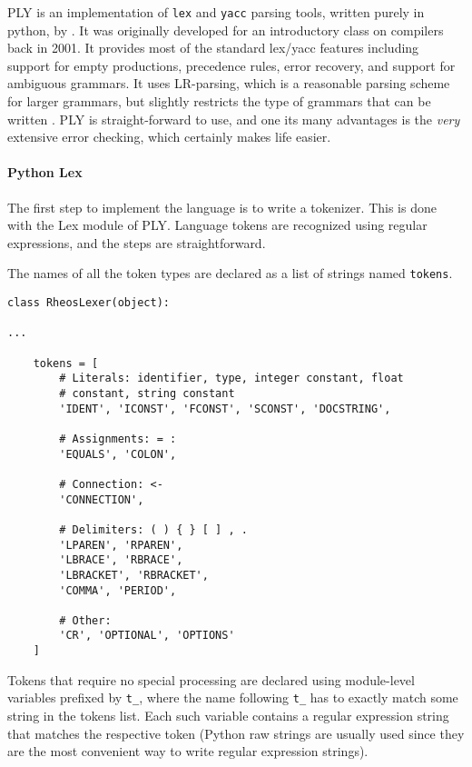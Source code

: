 PLY is an implementation of \texttt{lex} and \texttt{yacc} parsing
tools, written purely in python, by \citet{ply:online}. It was
originally developed for an introductory class on compilers back in
2001. It provides most of the standard lex/yacc features including
support for empty productions, precedence rules, error recovery, and
support for ambiguous grammars. It uses LR-parsing, which is a
reasonable parsing scheme for larger grammars, but slightly restricts
the type of grammars that can be written \citep{aho:2007}. PLY is
straight-forward to use, and one its many advantages is
the \emph{very} extensive error checking, which certainly makes life
easier.

\paragraph{Python Lex}
The first step to implement the language is to write a tokenizer. This
is done with the Lex module of PLY. Language tokens are recognized
using regular expressions, and the steps are straightforward.

The names of all the token types are declared as a list of strings
named \texttt{tokens}.

\begin{lstlisting}
class RheosLexer(object):

...

    tokens = [
        # Literals: identifier, type, integer constant, float
        # constant, string constant
        'IDENT', 'ICONST', 'FCONST', 'SCONST', 'DOCSTRING',

        # Assignments: = :
        'EQUALS', 'COLON',

        # Connection: <-
        'CONNECTION',

        # Delimiters: ( ) { } [ ] , .
        'LPAREN', 'RPAREN',
        'LBRACE', 'RBRACE',
        'LBRACKET', 'RBRACKET',
        'COMMA', 'PERIOD',

        # Other:
        'CR', 'OPTIONAL', 'OPTIONS'
    ]
\end{lstlisting}

Tokens that require no special processing are declared using
module-level variables prefixed by \texttt{t_}, where the name
following \texttt{t_} has to exactly match some string in the tokens
list. Each such variable contains a regular expression string that
matches the respective token (Python raw strings are usually used
since they are the most convenient way to write regular expression
strings).

